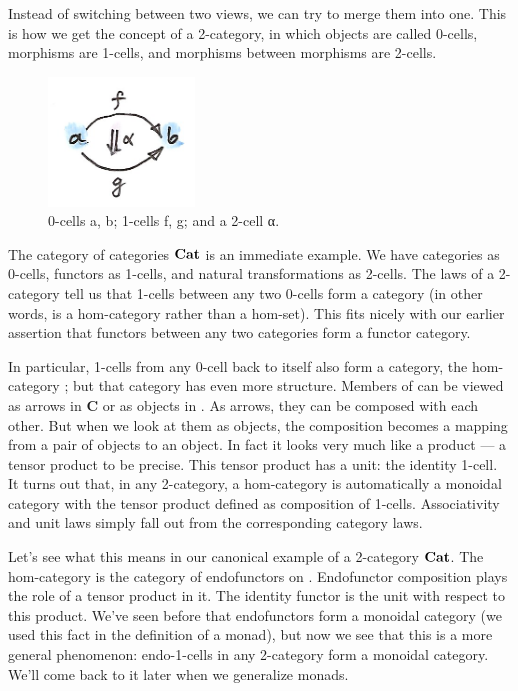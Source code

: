 Instead of switching between two views, we can try to merge them into
one. This is how we get the concept of a 2-category, in which objects
are called 0-cells, morphisms are 1-cells, and morphisms between
morphisms are 2-cells.

\begin{figure}[H]
\centering
\includegraphics[width=1.53125in]{images/twocat.png}
\caption{0-cells a, b; 1-cells f, g; and a 2-cell α.}
\end{figure}

\noindent
The category of categories $\mathbf{Cat}$ is an immediate example. We have
categories as 0-cells, functors as 1-cells, and natural transformations
as 2-cells. The laws of a 2-category tell us that 1-cells between any
two 0-cells form a category (in other words,  is a
hom-category rather than a hom-set). This fits nicely with our earlier
assertion that functors between any two categories form a functor
category.

In particular, 1-cells from any 0-cell back to itself also form a
category, the hom-category ; but that category has even
more structure. Members of  can be viewed as arrows in
\textbf{C} or as objects in . As arrows, they can be
composed with each other. But when we look at them as objects, the
composition becomes a mapping from a pair of objects to an object. In
fact it looks very much like a product --- a tensor product to be
precise. This tensor product has a unit: the identity 1-cell. It turns
out that, in any 2-category, a hom-category  is
automatically a monoidal category with the tensor product defined as
composition of 1-cells. Associativity and unit laws simply fall out from
the corresponding category laws.

Let's see what this means in our canonical example of a 2-category
$\mathbf{Cat}$. The hom-category  is the category of
endofunctors on . Endofunctor composition plays the role of a
tensor product in it. The identity functor is the unit with respect to
this product. We've seen before that endofunctors form a monoidal
category (we used this fact in the definition of a monad), but now we
see that this is a more general phenomenon: endo-1-cells in any
2-category form a monoidal category. We'll come back to it later when we
generalize monads.

